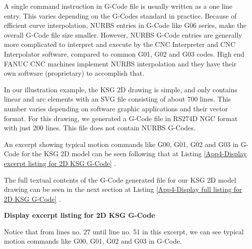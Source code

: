 \begin{enumerate}
A single command instruction in G-Code file is usually written as a one line entry. This varies depending on the G-Codes standard in practice. Because of efficient curve interpolation, NURBS entries in G-Code like G06 series, make the overall G-Code file size smaller. However, NURBS G-Code entries are generally more complicated to interpret and execute by the CNC Interpreter and CNC Interpolator software, compared to common G01, G02 and G03 codes. High end FANUC CNC machines implement NURBS interpolation and they have their own software (proprietary) to accomplish that.
\vspace{0.2cm}

In our illustration example, the KSG 2D drawing is simple, and only contains linear and arc elements with an SVG file consisting of about 700 lines. This number varies depending on software graphic applications and their vector format. For this drawing, we generated a G-Code file in RS274D NGC format with just 200 lines. This file does not contain NURBS G-Codes.
\vspace{0.2cm}

An excerpt showing typical motion commands like G00, G01, G02 and G03 in G-Code for the KSG 2D model can be seen following that at Listing \ref{App4-Display excerpt listing for 2D KSG G-Code} .

The full textual contents of the G-Code generated file for our KSG 2D model drawing can be seen in the next section at Listing \ref{App4-Display full listing for 2D KSG G-Code} . 

\end{enumerate}

\textbf{Display excerpt listing for 2D KSG G-Code}
\vspace{0.3cm}

Notice that from lines no. 27 until line no. 51 in this excerpt, we can see typical motion commands like G00, G01, G02 and G03 in G-Code. 


